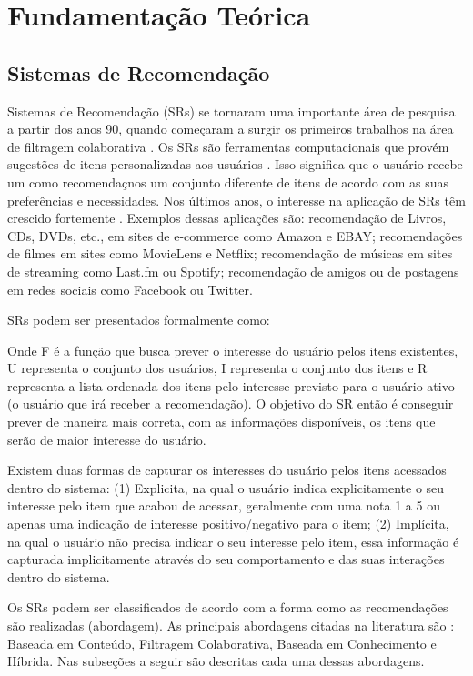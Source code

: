 \chapter{Fundamentação Teórica}

\section{Sistemas de Recomendação}

Sistemas de Recomendação (SRs) se tornaram uma importante área de pesquisa a partir dos anos 90, quando começaram a
surgir os primeiros trabalhos na área de filtragem colaborativa \cite{adomavicius2005toward}. Os SRs são ferramentas
computacionais que provém sugestões de itens personalizadas aos usuários \cite{ricci2011introduction}. Isso significa
que o usuário recebe um como recomendaçnos um conjunto diferente de itens de acordo com as suas preferências e necessidades.
Nos últimos anos, o interesse na aplicação de SRs têm crescido fortemente \cite{adomavicius2005toward, beel2016towards}.
Exemplos dessas aplicações são: recomendação de Livros, CDs, DVDs, etc., em sites de e-commerce como Amazon e EBAY;
recomendações de filmes em sites como MovieLens e Netflix; recomendação de músicas em sites de streaming como Last.fm ou
Spotify; recomendação de amigos ou de postagens em redes sociais como Facebook ou Twitter.

SRs podem ser presentados formalmente como:

Onde F é a função que busca prever o interesse do usuário pelos itens existentes, U representa o conjunto dos usuários,
I representa o conjunto dos itens e R representa a lista ordenada dos itens pelo interesse previsto para o usuário ativo
(o usuário que irá receber a recomendação). O objetivo do SR então é conseguir prever de maneira mais correta, com as
informações disponíveis, os itens que serão de maior interesse do usuário.

Existem duas formas de capturar os interesses do usuário pelos itens acessados dentro do sistema: (1) Explicita, na
qual o usuário indica explicitamente o seu interesse pelo item que acabou de acessar, geralmente com uma nota 1 a 5 ou
apenas uma indicação de interesse positivo/negativo para o item; (2) Implícita, na qual o usuário não precisa indicar o
seu interesse pelo item, essa informação é capturada implicitamente através do seu comportamento e das suas interações
dentro do sistema.

Os SRs podem ser classificados de acordo com a forma como as recomendações são realizadas (abordagem). As principais
abordagens citadas na literatura são \cite{torres2004personalizaccao, adomavicius2005toward, ricci2011introduction}:
Baseada em Conteúdo, Filtragem Colaborativa, Baseada em Conhecimento e Híbrida. Nas subseções a seguir são descritas
cada uma dessas abordagens.

